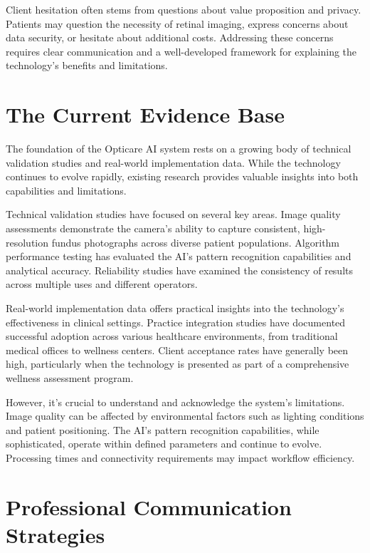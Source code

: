 \documentclass[
  Letterpaper,
]{scrbook}
\begin{document}
Client hesitation often stems from questions about value proposition and
privacy. Patients may question the necessity of retinal imaging, express
concerns about data security, or hesitate about additional costs.
Addressing these concerns requires clear communication and a
well-developed framework for explaining the technology's benefits and
limitations.

\section{The Current Evidence Base}\label{the-current-evidence-base}

The foundation of the Opticare AI system rests on a growing body of
technical validation studies and real-world implementation data. While
the technology continues to evolve rapidly, existing research provides
valuable insights into both capabilities and limitations.

Technical validation studies have focused on several key areas. Image
quality assessments demonstrate the camera's ability to capture
consistent, high-resolution fundus photographs across diverse patient
populations. Algorithm performance testing has evaluated the AI's
pattern recognition capabilities and analytical accuracy. Reliability
studies have examined the consistency of results across multiple uses
and different operators.

Real-world implementation data offers practical insights into the
technology's effectiveness in clinical settings. Practice integration
studies have documented successful adoption across various healthcare
environments, from traditional medical offices to wellness centers.
Client acceptance rates have generally been high, particularly when the
technology is presented as part of a comprehensive wellness assessment
program.

However, it's crucial to understand and acknowledge the system's
limitations. Image quality can be affected by environmental factors such
as lighting conditions and patient positioning. The AI's pattern
recognition capabilities, while sophisticated, operate within defined
parameters and continue to evolve. Processing times and connectivity
requirements may impact workflow efficiency.

\section{Professional Communication
Strategies}\label{professional-communication-strategies}
\end{document}
